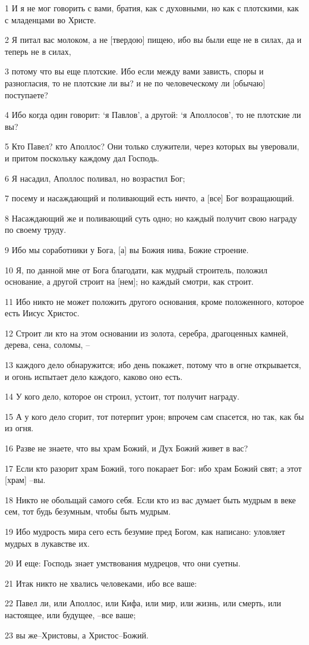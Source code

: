 \par 1 И я не мог говорить с вами, братия, как с духовными, но как с плотскими, как с младенцами во Христе.
\par 2 Я питал вас молоком, а не [твердою] пищею, ибо вы были еще не в силах, да и теперь не в силах,
\par 3 потому что вы еще плотские. Ибо если между вами зависть, споры и разногласия, то не плотские ли вы? и не по человеческому ли [обычаю] поступаете?
\par 4 Ибо когда один говорит: `я Павлов', а другой: `я Аполлосов', то не плотские ли вы?
\par 5 Кто Павел? кто Аполлос? Они только служители, через которых вы уверовали, и притом поскольку каждому дал Господь.
\par 6 Я насадил, Аполлос поливал, но возрастил Бог;
\par 7 посему и насаждающий и поливающий есть ничто, а [все] Бог возращающий.
\par 8 Насаждающий же и поливающий суть одно; но каждый получит свою награду по своему труду.
\par 9 Ибо мы соработники у Бога, [а] вы Божия нива, Божие строение.
\par 10 Я, по данной мне от Бога благодати, как мудрый строитель, положил основание, а другой строит на [нем]; но каждый смотри, как строит.
\par 11 Ибо никто не может положить другого основания, кроме положенного, которое есть Иисус Христос.
\par 12 Строит ли кто на этом основании из золота, серебра, драгоценных камней, дерева, сена, соломы, --
\par 13 каждого дело обнаружится; ибо день покажет, потому что в огне открывается, и огонь испытает дело каждого, каково оно есть.
\par 14 У кого дело, которое он строил, устоит, тот получит награду.
\par 15 А у кого дело сгорит, тот потерпит урон; впрочем сам спасется, но так, как бы из огня.
\par 16 Разве не знаете, что вы храм Божий, и Дух Божий живет в вас?
\par 17 Если кто разорит храм Божий, того покарает Бог: ибо храм Божий свят; а этот [храм] --вы.
\par 18 Никто не обольщай самого себя. Если кто из вас думает быть мудрым в веке сем, тот будь безумным, чтобы быть мудрым.
\par 19 Ибо мудрость мира сего есть безумие пред Богом, как написано: уловляет мудрых в лукавстве их.
\par 20 И еще: Господь знает умствования мудрецов, что они суетны.
\par 21 Итак никто не хвались человеками, ибо все ваше:
\par 22 Павел ли, или Аполлос, или Кифа, или мир, или жизнь, или смерть, или настоящее, или будущее, --все ваше;
\par 23 вы же--Христовы, а Христос--Божий.

